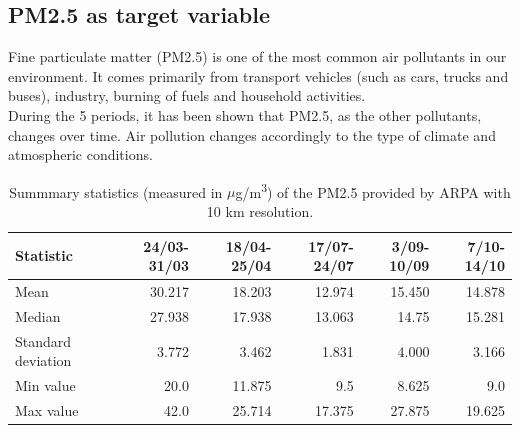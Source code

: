 \subsection{PM2.5 as target variable}
Fine particulate matter (PM2.5) is one of the most common air pollutants in our environment. 
It comes primarily from transport vehicles (such as cars, trucks and buses), industry, burning of fuels and household activities. \\
During the 5 periods, it has been shown that PM2.5, as the other pollutants, changes over time. Air pollution changes accordingly to the type of climate and atmospheric conditions.\\
\begin{table}[H]
\centering
\begin{tabular}{lrrrrr}
\toprule
 Statistic &  24/03-31/03 &  18/04-25/04 &  17/07-24/07 &  3/09-10/09 &  7/10-14/10 \\
\midrule
  Mean  &        30.217  &         18.203  &         12.974 &       15.450 &       14.878 \\
Median  &        27.938 &        17.938 &        13.063 &       14.75 &       15.281 \\
 Standard deviation &        3.772 &        3.462 &        1.831 &       4.000 &       3.166 \\
  Min value &        20.0  &        11.875 &        9.5 &        8.625 &       9.0 \\
  Max value &        42.0 &        25.714 &        17.375 &        27.875 &       19.625 \\
\bottomrule
\end{tabular}
\caption{Summmary statistics (measured in $\mu$g/m\textsuperscript{3}) of the PM2.5 provided by ARPA with 10 km resolution.}
\label{tab:statspm25}
\end{table}
